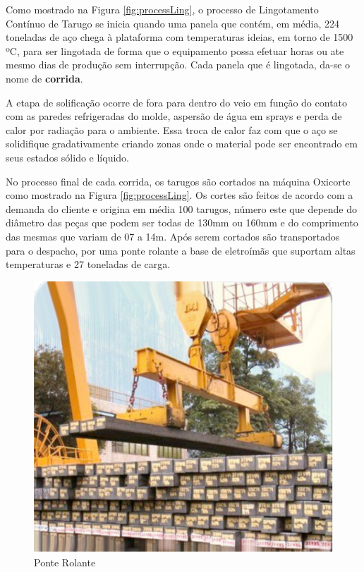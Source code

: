Como mostrado na Figura \ref{fig:processLing}, o processo de Lingotamento Contínuo de Tarugo se inicia quando uma panela que contém, em média, 224 toneladas de aço chega à plataforma com temperaturas ideias, em torno de 1500 ºC, para ser lingotada de forma que o equipamento possa efetuar horas ou ate mesmo dias de produção sem interrupção. Cada panela que é lingotada, da-se o nome de \textbf{corrida}. 

A etapa de solificação ocorre de fora para dentro do veio em função do contato com as paredes refrigeradas do molde, aspersão de água em sprays e perda de calor por radiação para o ambiente. Essa troca de calor faz com que o aço se solidifique gradativamente criando zonas onde o material pode ser encontrado em seus estados sólido e líquido.

No processo final de cada corrida, os tarugos são cortados na máquina Oxicorte como mostrado na Figura \ref{fig:processLing}. Os cortes são feitos de acordo com a demanda do cliente e origina em média 100 tarugos, número este que depende do diâmetro das peças que podem ser todas de 130mm ou 160mm e do comprimento das mesmas que variam de 07 a 14m. Após serem cortados são transportados para o despacho, por uma ponte rolante a base de eletroímãs que suportam altas temperaturas e 27 toneladas de carga. 


\begin{figure}[htbp]
	\centering
	\includegraphics[width=0.7\linewidth]{figuras/Steel/ponte_rolante.png}
	\caption{Ponte Rolante}
	\label{fig:crane}
\end{figure}

